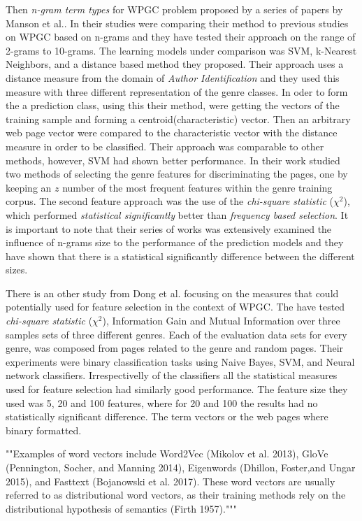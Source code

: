 Then \textit{n-gram term types} for WPGC problem proposed by a series of papers by Manson et al.\parencite{mason2009n,mason2009classifying,mason2009distance}. In their studies were comparing their method to previous studies on WPGC based on n-grams and they have tested their approach on the range of 2-grams to 10-grams. The learning models under comparison was SVM, k-Nearest Neighbors, and a distance based method they proposed. Their approach uses a distance measure from the domain of \textit{Author Identification} and they used this measure with three different representation of the genre classes. In oder to form the a prediction class, using this their method, were getting the vectors of the training sample and forming a centroid(characteristic) vector. Then an arbitrary web page vector were compared to the characteristic vector with the distance measure in order to be classified. Their approach was comparable to other methods, however, SVM had shown better performance. In their work studied two methods of selecting the genre features for discriminating the pages, one by keeping an $z$ number of the most frequent features within the genre training corpus. The second feature approach was the use of the \textit{chi-square statistic} ($\chi^{2}$), which performed \textit{statistical significantly} better than \textit{frequency based selection}. It is important to note that their series of works was extensively examined the influence of n-grams size to the performance of the prediction models and they have shown that there is a statistical
significantly difference between the different sizes.

There is an other study from Dong et al.\parencite{dong2006binary} focusing on the measures that could potentially used for feature selection in the context of WPGC. The have tested\textit{ chi-square statistic} ($\chi^{2}$), Information Gain and Mutual Information over three samples sets of three different genres. Each of the evaluation data sets for every genre, was composed from pages related to the genre and random pages. Their experiments were binary classification tasks using Naive Bayes, SVM, and Neural network classifiers. Irrespectivelly of the classifiers all the statistical measures used for feature selection had similarly good performance. The feature size they used was 5, 20 and 100 features, where for 20 and 100 the results had no statistically significant difference. The term vectors or the web pages where binary formatted.


""Examples of word vectors include Word2Vec (Mikolov et al. 2013), GloVe (Pennington, Socher, and Manning 2014), Eigenwords (Dhillon, Foster,and Ungar 2015), and Fasttext (Bojanowski et al. 2017). These word vectors are usually referred to as distributional word vectors, as their training methods rely on the distributional hypothesis of semantics (Firth 1957)."""

